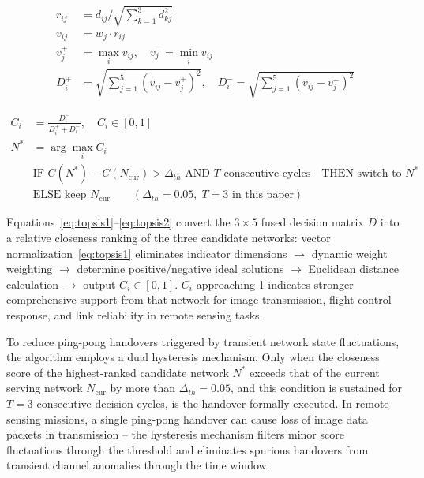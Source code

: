 \documentclass[journal,article,submit,moreauthors]{Definitions/mdpi}
\begin{document}
\begin{equation}
\begin{aligned}
r_{ij} &= d_{ij} \big/ \sqrt{\sum\nolimits_{k=1}^{3} d_{kj}^2} \\
v_{ij} &= w_j \cdot r_{ij} \\
v^+_j &= \max_i v_{ij}, \quad v^-_j = \min_i v_{ij} \\
D^+_i &= \sqrt{\sum\nolimits_{j=1}^{5} (v_{ij} - v^+_j)^2}, \quad D^-_i = \sqrt{\sum\nolimits_{j=1}^{5} (v_{ij} - v^-_j)^2}
\end{aligned}
\label{eq:topsis1}
\end{equation}

\begin{equation}
\begin{aligned}
C_i &= \frac{D^-_i}{D^+_i + D^-_i}, \quad C_i \in [0,1] \\
N^* &= \arg\max_i C_i \\
&\text{IF } C(N^*) - C(N_{\text{cur}}) > \Delta_{th} \text{ AND } T \text{ consecutive cycles} \quad \text{THEN switch to } N^* \\
&\text{ELSE keep } N_{\text{cur}} \qquad (\Delta_{th} = 0.05, \; T = 3 \text{ in this paper})
\end{aligned}
\label{eq:topsis2}
\end{equation}

Equations~\eqref{eq:topsis1}--\eqref{eq:topsis2} convert the $3 \times 5$ fused decision matrix $D$ into a relative closeness ranking of the three candidate networks: vector normalization~\eqref{eq:topsis1} eliminates indicator dimensions $\rightarrow$ dynamic weight weighting $\rightarrow$ determine positive/negative ideal solutions $\rightarrow$ Euclidean distance calculation $\rightarrow$ output $C_i \in [0,1]$. $C_i$ approaching 1 indicates stronger comprehensive support from that network for image transmission, flight control response, and link reliability in remote sensing tasks.

To reduce ping-pong handovers triggered by transient network state fluctuations, the algorithm employs a dual hysteresis mechanism. Only when the closeness score of the highest-ranked candidate network $N^*$ exceeds that of the current serving network $N_{\text{cur}}$ by more than $\Delta_{th} = 0.05$, and this condition is sustained for $T = 3$ consecutive decision cycles, is the handover formally executed. In remote sensing missions, a single ping-pong handover can cause loss of image data packets in transmission -- the hysteresis mechanism filters minor score fluctuations through the threshold and eliminates spurious handovers from transient channel anomalies through the time window.
\end{document}
